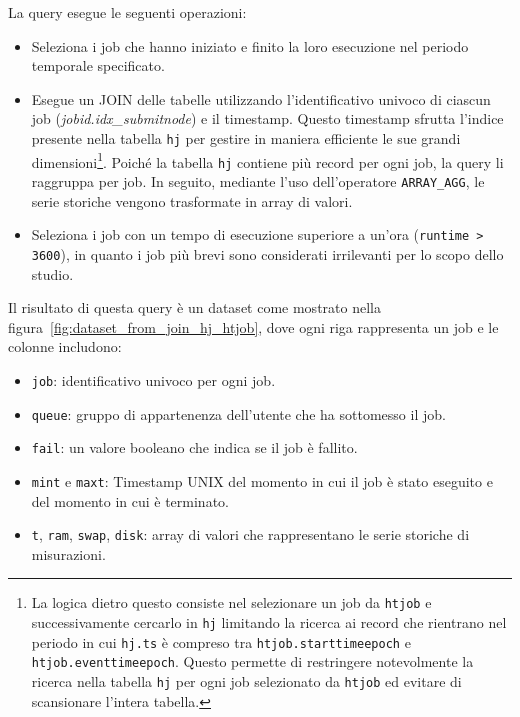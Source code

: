 La query esegue le seguenti operazioni:
\begin{itemize}
    \item Seleziona i job che hanno iniziato e finito la loro esecuzione nel
        periodo temporale specificato.
    \item Esegue un JOIN delle tabelle utilizzando l'identificativo univoco di
        ciascun job (\textit{jobid.idx\_submitnode}) e il timestamp. Questo
        timestamp sfrutta l'indice presente nella tabella \texttt{hj} per
        gestire in maniera efficiente le sue grandi dimensioni\footnote{La
            logica dietro questo consiste nel selezionare un job da
            \texttt{htjob} e successivamente cercarlo in \texttt{hj} limitando
            la ricerca ai record che rientrano nel periodo in cui
            \texttt{hj.ts} è compreso tra \texttt{htjob.starttimeepoch} e
            \texttt{htjob.eventtimeepoch}. Questo permette di restringere
            notevolmente la ricerca nella tabella \texttt{hj} per ogni job
            selezionato da \texttt{htjob} ed
        evitare di scansionare l'intera tabella.}. Poiché la tabella \texttt{hj} contiene più record per
        ogni job, la query li raggruppa per job. In seguito, mediante l'uso
        dell'operatore \verb|ARRAY_AGG|, le serie storiche vengono trasformate
        in array di valori.
    \item Seleziona i job con un tempo di esecuzione superiore a un'ora
        (\verb|runtime > 3600|), in quanto i job più brevi sono considerati
        irrilevanti per lo scopo dello studio.
\end{itemize}

Il risultato di questa query è un dataset come mostrato nella
figura~\ref{fig:dataset_from_join_hj_htjob}, dove ogni riga rappresenta un job
e le colonne includono: 

\begin{itemize}
    \item \texttt{job}: identificativo univoco per ogni job.
    \item \texttt{queue}: gruppo di appartenenza dell'utente che ha sottomesso
        il job.
    \item \texttt{fail}: un valore booleano che indica se il job è fallito.
    \item \texttt{mint} e \texttt{maxt}: Timestamp UNIX del momento in cui il
        job è stato eseguito e del momento in cui è terminato.
    \item \texttt{t}, \texttt{ram}, \texttt{swap}, \texttt{disk}: array di
        valori che rappresentano le serie storiche di misurazioni.
\end{itemize}

